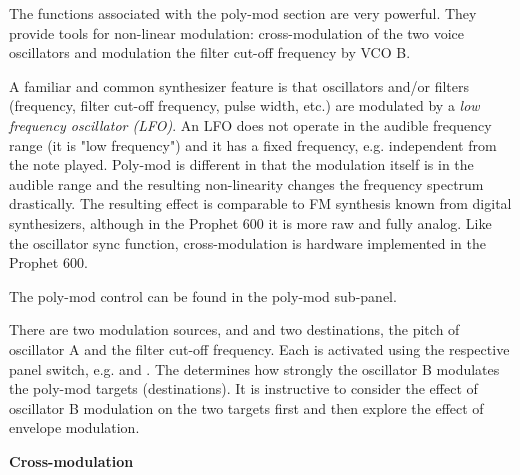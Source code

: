 The functions associated with the poly-mod section are very powerful. They provide tools for non-linear modulation: cross-modulation of the two voice oscillators and modulation the filter cut-off frequency by VCO B. 

A familiar and common synthesizer feature is that oscillators and/or filters (frequency, filter cut-off frequency, pulse width, etc.) are modulated by a \textit{low frequency oscillator (LFO)}. An LFO does not operate in the audible frequency range (it is "low frequency") and it has a fixed frequency, e.g. independent from the note played. Poly-mod is different in that the modulation itself is in the audible range and the resulting non-linearity changes the frequency spectrum drastically. The resulting effect is comparable to FM synthesis known from digital synthesizers, although in the Prophet 600 it is more raw and fully analog. Like the oscillator sync function, cross-modulation is hardware implemented in the Prophet 600.

The poly-mod control can be found in the poly-mod sub-panel. 

\begin{center}
\end{center}

There are two modulation sources, \polymodenv and \polymodosc and two destinations, the pitch of oscillator A  and the filter cut-off frequency. Each is activated using the respective panel switch, e.g. \polymodfreq and \polymodfilter. The \polymodosc  determines how strongly the oscillator B modulates the poly-mod targets (destinations). It is instructive to consider the effect of oscillator B modulation on the two targets first and then explore the effect of envelope modulation.

\textbf{Cross-modulation}


